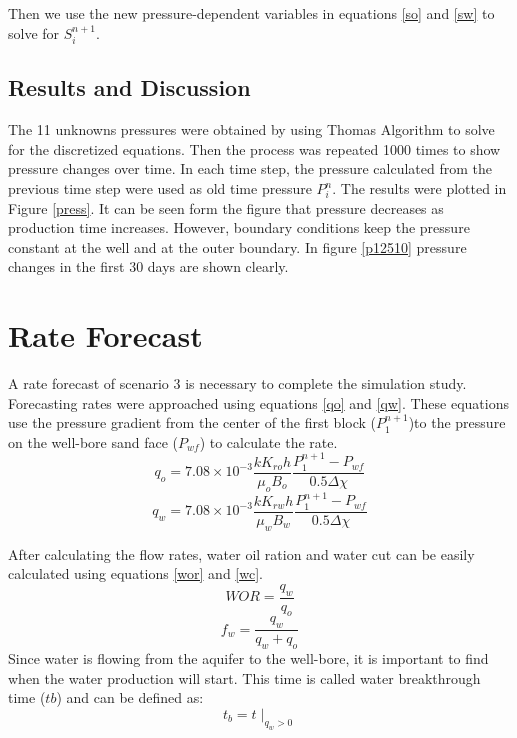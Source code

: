 \documentclass[12pt,letterpaper,titlepage]{article}
\begin{document}
Then we use the new pressure-dependent variables in equations \ref{so} and \ref{sw} to solve for $S_i^{n+1}$.


\subsection{Results and Discussion}
The 11 unknowns pressures were obtained by using Thomas Algorithm to solve for the discretized equations. Then the process was repeated 1000 times to show pressure changes over time. In each time step, the pressure calculated from the previous time step were used as old time pressure $P_i^n$. The results were plotted in Figure \ref{press}. It can be seen form the figure that pressure decreases as production time increases. However, boundary conditions keep the pressure constant at the well and at the outer boundary. In figure \ref{p12510} pressure changes in the first 30 days are shown clearly.


\section{Rate Forecast}
A rate forecast of scenario 3 is necessary to complete the simulation study. Forecasting rates were approached using equations \ref{qo} and \ref{qw}. These equations use the pressure gradient from the center of the first block ($P_1^{n+1}$)to the pressure on the well-bore sand face ($P_{wf}$) to calculate the rate. 
\begin{equation}
\label{qo}
q_o=7.08\times 10^{-3} \frac{kK_{ro}h}{\mu_o B_o} \frac{P_1^{n+1}-P_{wf}}{0.5 \Delta\chi}
\end{equation}
\begin{equation}
\label{qw}
q_w=7.08\times 10^{-3} \frac{kK_{rw}h}{\mu_w B_w} \frac{P_1^{n+1}-P_{wf}}{0.5 \Delta\chi}
\end{equation}

After calculating the flow rates, water oil ration and water cut can be easily calculated using equations \ref{wor} and \ref{wc}.
\begin{equation}
\label{wor}
WOR=\frac{q_w}{q_o}
\end{equation}
\begin{equation}
\label{wc}
f_w=\frac{q_w}{q_w+q_o}
\end{equation}
Since water is flowing from the aquifer to the well-bore, it is important to find when the water production will start. This time is called water breakthrough time ($tb$) and can be defined as:$$t_b=t\mid_{q_w>0}$$
\end{document}
